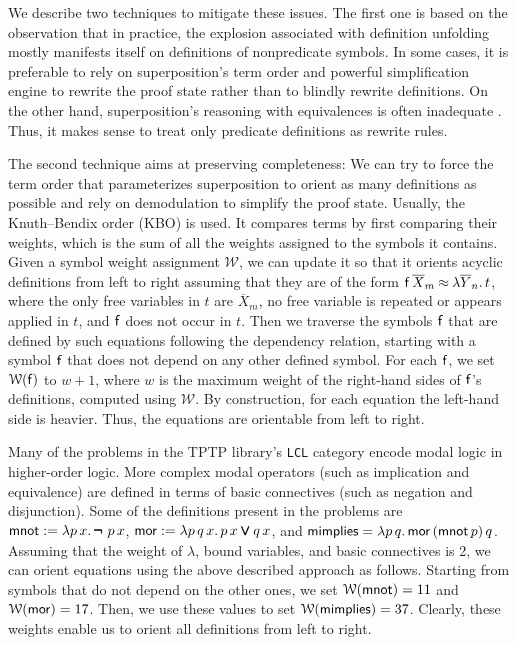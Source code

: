 \documentclass[smallcondensed,draft]{svjour3}     %
\begin{document}
We describe two techniques to mitigate these issues. The first one is based on the observation that in practice,
the explosion associated with definition unfolding mostly
manifests itself on definitions of nonpredicate symbols. In some cases, it is
preferable to rely on superposition's term order and powerful simplification
engine to rewrite the proof state rather than to blindly rewrite definitions. On
the other hand, superposition's reasoning with equivalences is often inadequate
\cite{bbtv-21-full-ho-sup, gs-05-boolsup}. Thus, it makes sense to treat only
predicate definitions as rewrite rules.

The second technique aims at preserving completeness: We can try to force the term order that
parameterizes superposition to orient as many definitions as possible and rely on
demodulation to simplify the proof state. Usually, the Knuth--Bendix order (KBO)
\cite{db-1970-kbo} is used. It compares terms by first comparing their weights,
which is the sum of all the weights assigned to the symbols it contains. Given a
symbol weight assignment $\mathcal{W}$, we can update it so that it orients
acyclic definitions from left to right assuming that they are of the form $
{\mathsf{f}} \, \overline{X}_m \mathbin{\approx} \lambda \overline{Y}_n. \, t$, where the only free
variables in $t$ are $\overline{X}_m$, no free variable is repeated or appears
applied in $t$, and ${\mathsf{f}}$ does not occur in $t$. Then we traverse the
symbols ${\mathsf{f}}$ that are defined by such equations following the dependency
relation, starting with a symbol ${\mathsf{f}}$ that does not depend on any other
defined symbol. For each ${\mathsf{f}}$, we set $\mathcal{W}({\mathsf{f}})$ to $w + 1$,
where $w$ is the maximum weight of the right-hand sides of ${\mathsf{f}}$'s
definitions, computed using $\mathcal{W}$. By construction, for each equation
the left-hand side is heavier. Thus, the equations are orientable from left to
right.



\begin{exa} 
  Many of the problems in the TPTP library's \verb|LCL| category encode modal logic
  in higher-order logic. More complex modal operators (such as
  implication and equivalence) are defined in terms of basic connectives (such as negation
  and disjunction). Some of the definitions present in the problems are
  ${\mathsf{mnot}} := \lambda p\, x. \, \pmb{\neg\,} \, p \, x$, ${\mathsf{mor}} := \lambda p\, q\, x.
  \, p \, x \pmb\lor q \, x$,  and ${\mathsf{mimplies}} = \lambda p\, q. \allowbreak\, {\mathsf{mor}} \,
  ({\mathsf{mnot}} \, p) \, q$. Assuming that the weight of $\lambda$, bound
  variables, and basic connectives is 2, we can orient equations using
  the above described approach as follows. Starting from symbols that do not
  depend on the other ones, we set $\mathcal{W}({\mathsf{mnot}}) = 11$ and
  $\mathcal{W}({\mathsf{mor}}) = 17$. Then, we use these values to set
  $\mathcal{W}({\mathsf{mimplies}}) = 37$. Clearly, these weights
  enable us to orient all definitions from left to right.
\end{exa}
\end{document}
